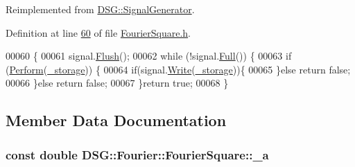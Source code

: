 Reimplemented from \hyperlink{class_d_s_g_1_1_signal_generator_ab050f80e84e6c8b3e354b56930d6a02b}{D\+S\+G\+::\+Signal\+Generator}.



Definition at line \hyperlink{_fourier_square_8h_source_l00060}{60} of file \hyperlink{_fourier_square_8h_source}{Fourier\+Square.\+h}.


\begin{DoxyCode}
00060                                                                          \{
00061             signal.\hyperlink{class_d_s_g_1_1_ring_buffer_ab23c8003d2857809a816068eeb209d60}{Flush}();
00062             \textcolor{keywordflow}{while} (!signal.\hyperlink{class_d_s_g_1_1_ring_buffer_a53ddb04ffcbb5470a8d2b0a3c65b70cb}{Full}()) \{
00063                 \textcolor{keywordflow}{if} (\hyperlink{class_d_s_g_1_1_fourier_1_1_fourier_square_a05bd0cd3e76ca22e1cede5afb47fbbc4}{Perform}(\hyperlink{class_d_s_g_1_1_signal_generator_a28a9b47a1aa0783029f11a19ba0363f2}{\_storage})) \{
00064                     \textcolor{keywordflow}{if}(signal.\hyperlink{class_d_s_g_1_1_ring_buffer_aa5dd2caa0a270173251faee40a43d692}{Write}(\hyperlink{class_d_s_g_1_1_signal_generator_a28a9b47a1aa0783029f11a19ba0363f2}{\_storage}))\{
00065                     \}\textcolor{keywordflow}{else} \textcolor{keywordflow}{return} \textcolor{keyword}{false};
00066                 \}\textcolor{keywordflow}{else} \textcolor{keywordflow}{return} \textcolor{keyword}{false};
00067             \}\textcolor{keywordflow}{return} \textcolor{keyword}{true};
00068         \}
\end{DoxyCode}


\subsection{Member Data Documentation}
\hypertarget{class_d_s_g_1_1_fourier_1_1_fourier_square_a974287b077bd7bff2b028dd1af75e3d0}{
\subsubsection[{\+\_\+a}]{\setlength{\rightskip}{0pt plus 5cm}const double D\+S\+G\+::\+Fourier\+::\+Fourier\+Square\+::\+\_\+a\hspace{0.3cm}{\ttfamily [protected]}}}\label{class_d_s_g_1_1_fourier_1_1_fourier_square_a974287b077bd7bff2b028dd1af75e3d0}


